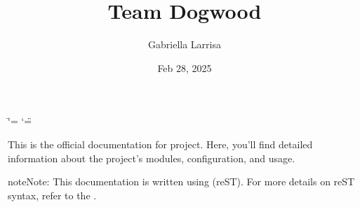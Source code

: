 \documentclass[letterpaper,10pt,english]{sphinxmanual}
\title{Team Dogwood}
\date{Feb 28, 2025}
\author{Gabriella Larrisa}
\begin{document}
\ifdefined\shorthandoff
  \ifnum\catcode`\=\string=\active\shorthandoff{=}\fi
  \ifnum\catcode`\"=\active{}\fi
\fi

\pagestyle{empty}
\sphinxmaketitle
\pagestyle{plain}
\sphinxtableofcontents
\pagestyle{normal}
\label{\detokenize{index::doc}}


\sphinxAtStartPar
This is the official documentation for  project. Here, you’ll find detailed information about the project’s modules, configuration, and usage.

\begin{sphinxadmonition}{note}{Note:}
\sphinxAtStartPar
This documentation is written using  (reST). For more details on reST syntax, refer to the
.
\end{sphinxadmonition}
\end{document}
